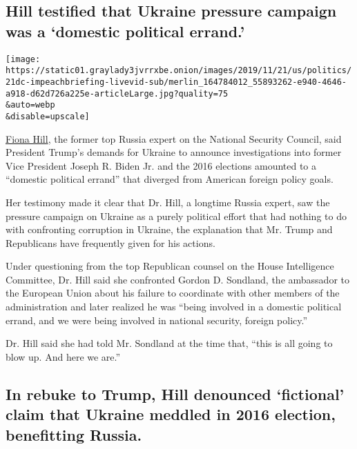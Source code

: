 \hypertarget{hill-testified-that-ukraine-pressure-campaign-was-a-domestic-political-errand}{%
\subsection{Hill testified that Ukraine pressure campaign was a
`domestic political
errand.'}\label{hill-testified-that-ukraine-pressure-campaign-was-a-domestic-political-errand}}

\texttt{[image: https://static01.graylady3jvrrxbe.onion/images/2019/11/21/us/politics/21dc-impeachbriefing-livevid-sub/merlin\_164784012\_55893262-e940-4646-a918-d62d726a225e-articleLarge.jpg?quality=75\\\&auto=webp\\\&disable=upscale]}

\href{https://www.nytimes3xbfgragh.onion/2019/11/21/us/politics/fiona-hill-trump-impeachment.html}{Fiona
Hill}, the former top Russia expert on the National Security Council,
said President Trump's demands for Ukraine to announce investigations
into former Vice President Joseph R. Biden Jr. and the 2016 elections
amounted to a ``domestic political errand'' that diverged from American
foreign policy goals.

Her testimony made it clear that Dr. Hill, a longtime Russia expert, saw
the pressure campaign on Ukraine as a purely political effort that had
nothing to do with confronting corruption in Ukraine, the explanation
that Mr. Trump and Republicans have frequently given for his actions.

Under questioning from the top Republican counsel on the House
Intelligence Committee, Dr. Hill said she confronted Gordon D. Sondland,
the ambassador to the European Union about his failure to coordinate
with other members of the administration and later realized he was
``being involved in a domestic political errand, and we were being
involved in national security, foreign policy.''

Dr. Hill said she had told Mr. Sondland at the time that, ``this is all
going to blow up. And here we are.''

\hypertarget{in-rebuke-to-trump-hill-denounced-fictional-claim-that-ukraine-meddled-in-2016-election-benefitting-russia}{%
\subsection{In rebuke to Trump, Hill denounced `fictional' claim that
Ukraine meddled in 2016 election, benefitting
Russia.}\label{in-rebuke-to-trump-hill-denounced-fictional-claim-that-ukraine-meddled-in-2016-election-benefitting-russia}}

